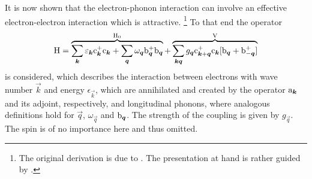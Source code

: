 It is now shown that the electron-phonon interaction can involve an effective
electron-electron interaction which is attractive.%
%
\footnote{The original derivation is due to  \cite{Froehlich52}.
The presentation at hand is rather guided by  \cite{Czycholl08}.}
%
To that end the  operator
%
\begin{gather*}
    \mathrm H = \overbrace{
        \sum_{\boldsymbol k} \varepsilon_{\boldsymbol k} \mathrm c_{\boldsymbol k}^+ \mathrm c_{\boldsymbol k} +
        \sum_{\boldsymbol q} \omega_{\boldsymbol q} \mathrm b_{\boldsymbol q}^+ \mathrm b_{\boldsymbol q}
    }^{\mathrm H_0} + \overbrace{
        \sum_{\boldsymbol k \boldsymbol q} g_{\boldsymbol q} \mathrm c_{\boldsymbol k + \boldsymbol q}^+ \mathrm c_{\boldsymbol k}
        [\mathrm b_{\boldsymbol q} + \mathrm b_{-\boldsymbol q}^+]
    }^{\mathrm V}
\end{gather*}
%
is considered, which describes the interaction between electrons with wave
number $\vec k$ and energy $\epsilon_{\vec k}$, which are annihilated and
created by the  operator $\mathrm a_{\boldsymbol k}$ and its adjoint,
respectively, and longitudinal phonons, where analogous definitions hold for
$\vec q$, $\omega_{\vec q}$ and $\mathrm b_{\boldsymbol q}$. The strength of the coupling
is given by $g_{\vec q}$. The spin is of no importance here and thus omitted.

